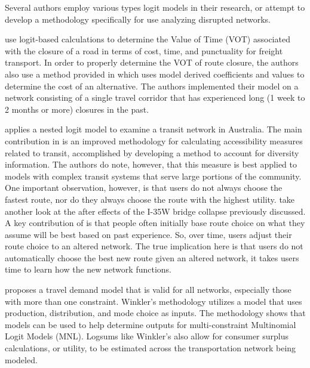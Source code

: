 \noindent Several authors employ various types logit models in their research,
or attempt to develop a methodology specifically for use analyzing disrupted networks.

\citet{Masiero2012} use logit-based calculations to determine the Value of
Time (VOT) associated with the closure of a road in terms of cost, time,
and punctuality for freight transport. In order to properly determine the
VOT of route closure, the authors also use a method provided in
\citet{koppelman2006} which uses model derived coefficients and values to
determine the cost of an alternative. The authors implemented their
model on a network consisting of a single travel corridor that has
experienced long (1 week to 2 months or more) closures in the past.

\citet{Nassir2016} applies a nested logit model to examine a transit
network in Australia. The main contribution in \citet{Nassir2016} is an
improved methodology for calculating accessibility measures related to
transit, accomplished by developing a method to account for diversity
information. The authors do note, however, that this measure is best applied
to models with complex transit systems that serve large portions of the
community. One important observation, however, is that users do not always
choose the fastest route, nor do they always choose the route with the
highest utility. \citet{He2012} take another look at the after effects of
the I-35W bridge collapse previously discussed. A key contribution of
\citet{He2012} is that people often initially base route choice on what they
assume will be best based on past experience. So, over time, users
adjust their route choice to an altered network. The true implication here
is that users do not automatically choose the best new route given an
altered network, it takes users time to learn how the new network
functions.

\citet{winkler2016} proposes a travel demand model that is valid for all
networks,
especially those with more than one constraint.
Winkler’s methodology
utilizes a
model that uses production, distribution, and mode choice as inputs. The
methodology shows that models can be used to help determine outputs for
multi-constraint Multinomial Logit Models (MNL). Logsums like Winkler’s
also allow for consumer surplus calculations,
or utility, to be estimated across the transportation network
being modeled.

